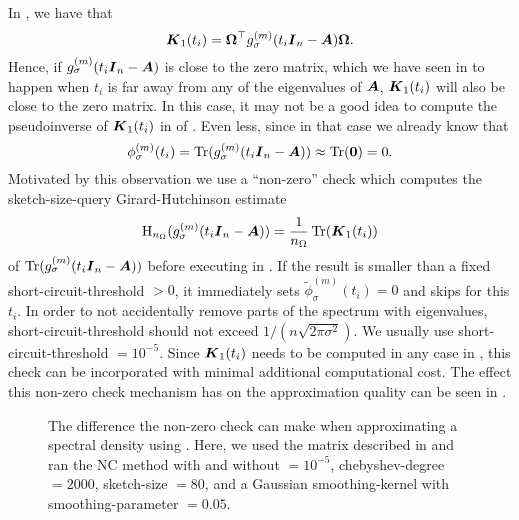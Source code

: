 In , we have that
\begin{equation}
    \boldsymbol{K}_1(t_i) = \boldsymbol{\Omega}^{\top} g_{\sigma}^{(m)}(t_i\boldsymbol{I}_n - \boldsymbol{A}) \boldsymbol{\Omega}.
    \label{equ:3-nystrom-interpolated-matrix}
\end{equation}
Hence, if $g_{\sigma}^{(m)}(t_i\boldsymbol{I}_n - \boldsymbol{A})$ is close to the zero matrix,
which we have seen in  to happen when
$t_i$ is far away from any of the eigenvalues of $\boldsymbol{A}$, $\boldsymbol{K}_1(t_i)$ will
also be close to the zero matrix. In this case, it may not be a good idea to
compute the pseudoinverse of $\boldsymbol{K}_1(t_i)$ in 
of . Even less, since in that case we already know that
\begin{equation}
    \phi_{\sigma}^{(m)}(t_i) = \operatorname{Tr}(g_{\sigma}^{(m)}(t_i\boldsymbol{I}_n - \boldsymbol{A})) \approx \operatorname{Tr}(\boldsymbol{0}) = 0.
    \label{equ:3-nystrom-short-circuit}
\end{equation}
Motivated by this observation we use a \enquote{non-zero} check which 
computes the \gls{sketch-size}-query Girard-Hutchinson estimate 
\begin{equation}
    \operatorname{H}_{n_{\Omega}}(g_{\sigma}^{(m)}(t_i \boldsymbol{I}_n - \boldsymbol{A})) = \frac{1}{n_{\Omega}} \operatorname{Tr}(\boldsymbol{K}_1(t_i))
    \label{equ:3-nystrom-short-circuit-hutchinson}
\end{equation}
of $\operatorname{Tr}(g_{\sigma}^{(m)}(t_i\boldsymbol{I}_n - \boldsymbol{A}))$
before executing  in .
If the result is smaller than a fixed \gls{short-circuit-threshold} $> 0$, it immediately sets
$\widetilde{\phi}_{\sigma}^{(m)}(t_i)=0$ and skips 
for this $t_i$. In order to not accidentally remove parts of the spectrum with eigenvalues,
\gls{short-circuit-threshold} should not exceed $1/(n \sqrt{2\pi \sigma^2})$.
We usually use \gls{short-circuit-threshold} $= 10^{-5}$. Since $\boldsymbol{K}_1(t_i)$
needs to be computed in any case in ,
this check can be incorporated with minimal additional computational cost. The effect this non-zero check
mechanism has on the approximation quality can be seen in .\\

\begin{figure}[ht]
    \centering
    
    \caption{The difference the non-zero check can make when approximating
        a spectral density using . 
        Here, we used the matrix described in 
        and ran the \gls{NC} method with and without  $= 10^{-5}$,
        \gls{chebyshev-degree} $=2000$, \gls{sketch-size} $=80$, and a
        Gaussian \gls{smoothing-kernel} with \gls{smoothing-parameter} $=0.05$.}
    \label{fig:3-nystrom-short-circuit-mechanism}
\end{figure}

